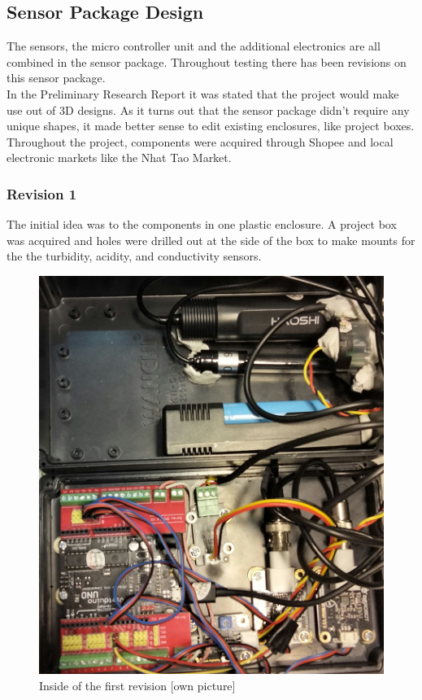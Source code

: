 \newpage
\subsection{Sensor Package Design}
The sensors, the micro controller unit and the additional electronics are all combined in the sensor package. Throughout testing there has been revisions on this sensor package.\\

In the Preliminary Research Report it was stated that the project would make use out of \gls{3D} designs. As it turns out that the sensor package didn't require any unique shapes, it made better sense to edit existing enclosures, like project boxes. Throughout the project, components were acquired through  Shopee \cite{shopee} and local electronic markets like the Nhat Tao Market. \cite{nhattao}

\subsubsection{Revision 1}
The initial idea was to the components in one plastic enclosure. A project box was acquired and holes were drilled out at the side of the box to make mounts for the the turbidity, acidity, and conductivity sensors.

\begin{figure}[h]
\centering
\includegraphics[scale=0.1]{070_design/package/51_rev1.jpg}
\caption{Inside of the first revision [own picture]}
\end{figure}

